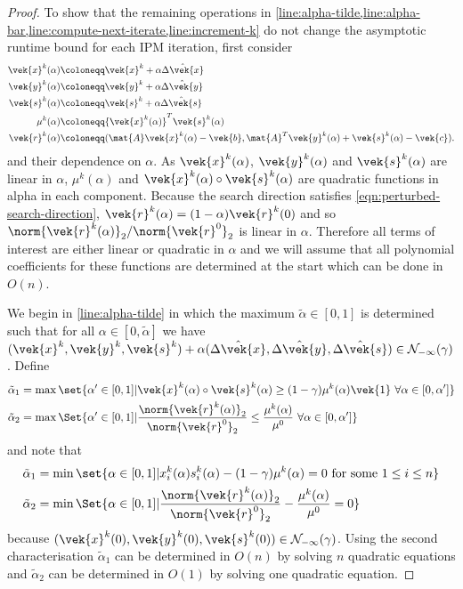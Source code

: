 \begin{proof}
  To show that the remaining operations in \cref{line:alpha-tilde,line:alpha-bar,line:compute-next-iterate,line:increment-k} do not change the asymptotic runtime bound for each IPM iteration, first consider
  \begin{align*}
    \vek{x}^k(\alpha) &\coloneqq \vek{x}^k + \alpha \hat{\Delta\vek{x}} \\
    \vek{y}^k(\alpha) &\coloneqq \vek{y}^k + \alpha \hat{\Delta\vek{y}} \\
    \vek{s}^k(\alpha) &\coloneqq \vek{s}^k + \alpha \hat{\Delta\vek{s}} \\
    \mu^k(\alpha) &\coloneqq {\vek{x}^k(\alpha)}^T \vek{s}^k(\alpha) \\
    \vek{r}^k(\alpha) &\coloneqq (\mat{A}\vek{x}^k(\alpha) - \vek{b}, \mat{A}^T \vek{y}^k(\alpha) + \vek{s}^k(\alpha) - \vek{c}).
  \end{align*}
  and their dependence on \(\alpha\).
  As \(\vek{x}^k(\alpha)\), \(\vek{y}^k(\alpha)\) and \(\vek{s}^k(\alpha)\) are linear in \(\alpha\), \(\mu^k(\alpha)\) and \(\vek{x}^k(\alpha) \circ \vek{s}^k(\alpha)\) are quadratic functions in alpha in each component.
  Because the search direction satisfies \cref{eqn:perturbed-search-direction}, \(\vek{r}^k(\alpha) = (1 - \alpha)\vek{r}^k(0)\) and so \(\norm{\vek{r}^k(\alpha)}_2 / \norm{\vek{r}^0}_2\) is linear in \(\alpha\).
  Therefore all terms of interest are either linear or quadratic in \(\alpha\) and we will assume that all polynomial coefficients for these functions are determined at the start which can be done in \(O(n)\).

  We begin in \cref{line:alpha-tilde} in which the maximum \(\tilde{\alpha} \in [0, 1]\) is determined such that for all \(\alpha \in [0, \tilde{\alpha}]\) we have \((\vek{x}^k, \vek{y}^k, \vek{s}^k) + \alpha (\hat{\Delta\vek{x}}, \hat{\Delta\vek{y}}, \hat{\Delta\vek{s}}) \in \mathcal{N}_{-\infty}(\gamma)\).
  Define
  \begin{align*}
    \tilde{\alpha}_1 &= \max \set{\alpha' \in [0, 1] | \vek{x}^k(\alpha) \circ \vek{s}^k(\alpha) \geq (1 - \gamma)\mu^k(\alpha) \vek{1} \ \forall \alpha \in [0, \alpha']} \\
    \tilde{\alpha}_2 &= \max \Set{\alpha' \in [0, 1] | \frac{\norm{\vek{r}^k(\alpha)}_2}{\norm{\vek{r}^0}_2} \leq \frac{\mu^k(\alpha)}{\mu^0} \ \forall \alpha \in [0, \alpha']}
  \end{align*}
  and note that
  \begin{align*}
    \tilde{\alpha}_1 &= \min \set{ \alpha \in [0, 1] | x_i^k(\alpha) s_i^k(\alpha) - (1 - \gamma)\mu^k(\alpha) = 0 \text{ for some } 1 \leq i \leq n } \\
    \tilde{\alpha}_2 &= \min \Set{ \alpha \in [0, 1] | \frac{\norm{\vek{r}^k(\alpha)}_2}{\norm{\vek{r}^0}_2} - \frac{\mu^k(\alpha)}{\mu^0} = 0 }
  \end{align*}
  because \((\vek{x}^k(0), \vek{y}^k(0), \vek{s}^k(0)) \in \mathcal{N}_{-\infty}(\gamma)\).
  Using the second characterisation \(\tilde{\alpha}_1\) can be determined in \(O(n)\) by solving \(n\) quadratic equations and \(\tilde{\alpha}_2\) can be determined in \(O(1)\) by solving one quadratic equation.


\end{proof}
